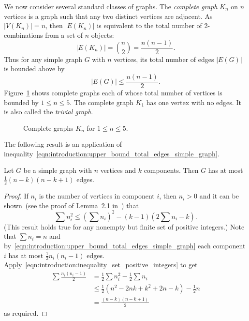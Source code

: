 We now consider several standard classes of graphs. The
\emph{complete graph} $K_n$ on $n$
vertices is a graph such that any two distinct vertices are
adjacent. As $|V(K_n)| = n$, then $|E(K_n)|$ is equivalent to the
total number of 2-combinations from a set of $n$ objects:
\begin{equation}
\label{eqn:introduction:size_of_K_n}
|E(K_n)|
=
\binom{n}{2}
=
\frac{n(n-1)}{2}.
\end{equation}
Thus for any simple graph $G$ with $n$ vertices, its total number of
edges $|E(G)|$ is bounded above by
\begin{equation}
\label{eqn:introduction:upper_bound_total_edges_simple_graph}
|E(G)|
\leq
\frac{n(n - 1)}{2}.
\end{equation}
Figure~\ref{fig:introduction:five_complete_graphs} shows complete
graphs each of whose total number of vertices is bounded by
$1 \leq n \leq 5$. The complete graph $K_1$ has one vertex with
no edges. It is also called the
\emph{trivial graph}.

\begin{figure}[!htbp]
\centering
{}

\caption{Complete graphs $K_n$ for $1 \leq n \leq 5$.}
\label{fig:introduction:five_complete_graphs}
\end{figure}

The following result is an application of
inequality~\eqref{eqn:introduction:upper_bound_total_edges_simple_graph}.

\begin{theorem}
Let $G$ be a simple graph with $n$ vertices and $k$ components. Then
$G$ has at most $\frac{1}{2} (n - k)(n - k + 1)$ edges.
\end{theorem}

\begin{proof}
If $n_i$ is the number of vertices in component $i$, then $n_i > 0$
and it can be shown~(see the proof of Lemma~2.1
in~\cite[pp.21--22]{Foulds1992}) that
\begin{equation}
\label{eqn:introduction:inequality_set_positive_integers}
\sum n_i^2
\leq
\left(\sum n_i\right)^2 - (k - 1) \left(2 \sum n_i - k\right).
\end{equation}
(This result holds true for any nonempty but finite set of positive
integers.) Note that $\sum n_i = n$ and
by~\eqref{eqn:introduction:upper_bound_total_edges_simple_graph} each
component $i$ has at most $\frac{1}{2} n_i (n_i - 1)$
edges. Apply~\eqref{eqn:introduction:inequality_set_positive_integers}
to get
\begin{align*}
\sum \frac{n_i (n_i - 1)}{2}
&=
\frac{1}{2} \sum n_i^2 - \frac{1}{2} \sum n_i \\[4pt]
&\leq
\frac{1}{2} (n^2 - 2nk + k^2 + 2n - k) - \frac{1}{2} n \\[4pt]
&=
\frac{(n - k) (n - k + 1)}{2}
\end{align*}
as required.
\end{proof}

